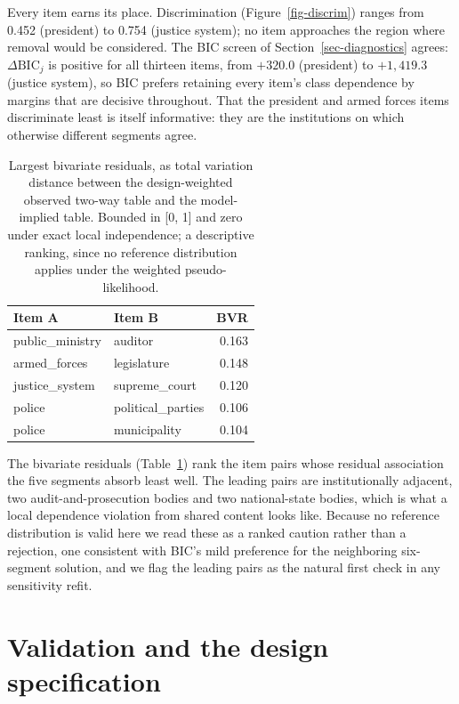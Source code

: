 \documentclass[
  12pt]{article}
\begin{document}
Every item earns its place. Discrimination (Figure~\ref{fig-discrim})
ranges from 0.452 (president) to 0.754 (justice system); no item
approaches the region where removal would be considered. The BIC screen
of Section~\ref{sec-diagnostics} agrees: \(\Delta\mathrm{BIC}_j\) is
positive for all thirteen items, from \(+320.0\) (president) to
\(+1{,}419.3\) (justice system), so BIC prefers retaining every item's
class dependence by margins that are decisive throughout. That the
president and armed forces items discriminate least is itself
informative: they are the institutions on which otherwise different
segments agree.

\begin{longtable}[]{@{}llr@{}}

\caption{\label{tbl-bvr}Largest bivariate residuals, as total variation
distance between the design-weighted observed two-way table and the
model-implied table. Bounded in {[}0, 1{]} and zero under exact local
independence; a descriptive ranking, since no reference distribution
applies under the weighted pseudo-likelihood.}

\tabularnewline

\toprule\noalign{}
Item A & Item B & BVR \\
\midrule\noalign{}
\endhead
\bottomrule\noalign{}
\endlastfoot
public\_ministry & auditor & 0.163 \\
armed\_forces & legislature & 0.148 \\
justice\_system & supreme\_court & 0.120 \\
police & political\_parties & 0.106 \\
police & municipality & 0.104 \\

\end{longtable}

The bivariate residuals (Table~\ref{tbl-bvr}) rank the item pairs whose
residual association the five segments absorb least well. The leading
pairs are institutionally adjacent, two audit-and-prosecution bodies and
two national-state bodies, which is what a local dependence violation
from shared content looks like. Because no reference distribution is
valid here we read these as a ranked caution rather than a rejection,
one consistent with BIC's mild preference for the neighboring
six-segment solution, and we flag the leading pairs as the natural first
check in any sensitivity refit.

\section{Validation and the design
specification}\label{sec-results-design}
\end{document}
